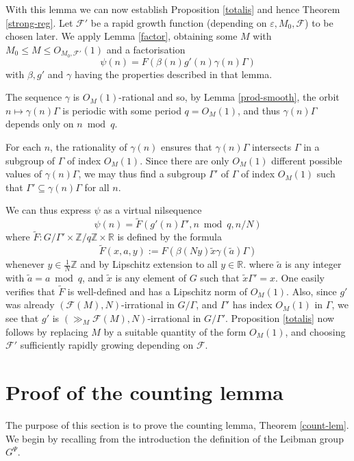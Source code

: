 \documentclass[11pt,reqno]{amsart}
\numberwithin{equation}{section}
\theoremstyle{plain}
\theoremstyle{definition}
\renewcommand{\leq}{\leqslant}
\renewcommand{\mod}{{\ \operatorname{mod}\ }}
\newcommand\Z{\mathbb{Z}}
\newcommand\R{\mathbb{R}}
\newcommand\1{{\bf 1}}
\newcommand\2{{\bf 2}}
\newcommand\eps{\varepsilon}
\newcommand\Grow{{\mathcal F}}
\begin{document}
With this lemma we can now establish Proposition \ref{totalis} and hence Theorem \ref{strong-reg}.  Let $\Grow'$ be a rapid growth function (depending on $\eps,M_0,\Grow$) to be chosen later.  We apply Lemma \ref{factor}, obtaining some $M$ with $M_0 \leq M \leq O_{M_0,\Grow'}(1)$ and a factorisation
$$ \psi(n) = F( \beta(n) g'(n) \gamma(n) \Gamma )$$
with $\beta,g'$ and $\gamma$ having the properties described in that lemma.

The sequence $\gamma$ is $O_{M}(1)$-rational and so, by Lemma \ref{prod-smooth}, the orbit $n \mapsto \gamma(n) \Gamma$ is periodic with some period $q = O_{M}(1)$, and thus $\gamma(n) \Gamma$ depends only on $n \mod q$.  

For each $n$, the rationality of $\gamma(n)$ ensures that $\gamma(n) \Gamma$ intersects $\Gamma$ in a subgroup of $\Gamma$ of index $O_M(1)$.  Since there are only $O_M(1)$ different possible values of $\gamma(n) \Gamma$, we may thus find a subgroup $\Gamma'$ of $\Gamma$ of index $O_M(1)$ such that $\Gamma' \subseteq \gamma(n) \Gamma$ for all $n$.

We can thus express $\psi$ as a virtual nilsequence
$$ \psi(n) = \tilde F( g'(n) \Gamma', n \mod q, n/N )$$
where $\tilde F: G/\Gamma' \times \Z/q\Z \times \R$ is defined by the formula
$$ \tilde F( x, a, y ) := F( \beta(Ny) \tilde x \gamma(\tilde a) \Gamma )$$ whenever $y \in \frac{1}{N}\Z$ and by Lipschitz extension to all $y \in \R$.
where $\tilde a$ is any integer with $\tilde a =a \mod q$, and $\tilde x$ is any element of $G$ such that $\tilde x\Gamma' = x$.  One easily verifies that $\tilde F$ is well-defined and has a Lipschitz norm of $O_M(1)$.  Also, since $g'$ was already $(\Grow(M),N)$-irrational in $G/\Gamma$, and $\Gamma'$ has index $O_M(1)$ in $\Gamma$, we see that $g'$ is $(\gg_M \Grow(M),N)$-irrational in $G/\Gamma'$.  Proposition \ref{totalis} now follows by replacing $M$ by a suitable quantity of the form $O_{M}(1)$, and choosing $\Grow'$ sufficiently rapidly growing depending on $\Grow$.

\section{Proof of the counting lemma}\label{counting-sec}

The purpose of this section is to prove the counting lemma, Theorem \ref{count-lem}. We begin by recalling from the introduction the definition of the Leibman group $G^{\Psi}$.
\end{document}
